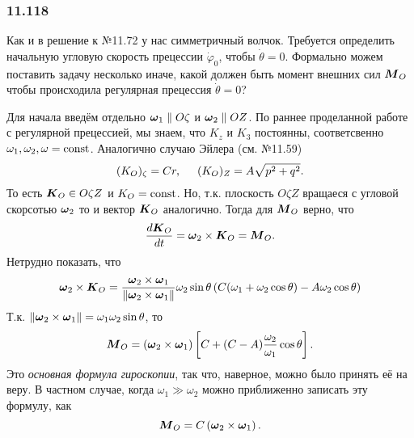\subsubsection*{11.118}

Как и в решение к №11.72 у нас симметричный волчок. Требуется определить начальную угловую скорость прецессии $\dot{\varphi}_0$, чтобы $\dot{\theta}=0$. 
Формально можем поставить задачу несколько иначе, какой должен быть момент внешних сил $\mbox{\boldmath $M$}_O$ чтобы происходила регулярная прецессия $\dot{\theta}=0$?

Для начала введём отдельно $\mbox{\boldmath $\omega$}_1 \parallel O\zeta$ и $\mbox{\boldmath $\omega$}_2 \parallel OZ$.
 По раннее проделанной работе с регулярной прецессией, мы знаем, что $K_z$ и $K_3$ постоянны, соответсвенно $\omega_1, \omega_2, \omega = \text{const}$.
 Аналогично случаю Эйлера (см. №11.59)
 \begin{equation*}
     (K_O)_\zeta = Cr, \hspace{0.5cm} (K_O)_Z = A \sqrt{p^2 + q^2}.
 \end{equation*}
 То есть $\mbox{\boldmath $K$}_O \in O\zeta Z$ и $K_O=\text{const}$. Но, т.к. плоскость $O\zeta Z$ вращаеся с угловой скорсотью $\mbox{\boldmath $\omega$}_2$ то и вектор $\mbox{\boldmath $K$}_O$ аналогично. Тогда для $\mbox{\boldmath $M$}_O$ верно, что
 \begin{equation}
     \frac{d \mbox{\boldmath $K$}_O}{d t} = \mbox{\boldmath $\omega$}_2 \times \mbox{\boldmath $K$}_O = \mbox{\boldmath $M$}_O.
 \end{equation}
 Нетрудно показать, что
 \begin{equation*}
     \mbox{\boldmath $\omega$}_2 \times \mbox{\boldmath $K$}_O = 
     \frac{\mbox{\boldmath $\omega$}_2\times \mbox{\boldmath $\omega$}_1}{\|\mbox{\boldmath $\omega$}_2\times \mbox{\boldmath $\omega$}_1\|} \omega_2 \sin \theta
     \left(
        C (\omega_1 + \omega_2 \cos \theta) - A \omega_2 \cos \theta
     \right) 
 \end{equation*}
 Т.к. $\|\mbox{\boldmath $\omega$}_2 \times \mbox{\boldmath $\omega$}_1\| = \omega_1 \omega_2 \sin \theta$, то
 \begin{equation}
 \label{ggg}
    \mbox{\boldmath $M$}_O = 
     (\mbox{\boldmath $\omega$}_2 \times \mbox{\boldmath $\omega$}_1) \left[
        C + (C-A) \frac{\omega_2}{\omega_1} \cos \theta
     \right].
 \end{equation}
 Это \textit{основная формула гироскопии}, так что, наверное, можно было принять её на веру. В частном случае, когда $\omega_1 \gg \omega_2$ можно приближенно записать эту формулу, как
 \begin{equation}
     \mbox{\boldmath $M$}_O = C \left(\mbox{\boldmath $\omega$}_2 \times \mbox{\boldmath $\omega$}_1\right).
 \end{equation}

